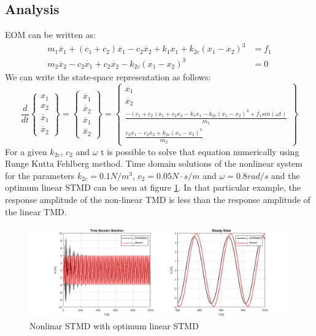 \subsection{Analysis}
EOM can be written as:\\
\begin{align*}
m_1 \ddot{x_1}+(c_1+c_2)\dot{x_1}-c_2\dot{x_2}+k_1x_1+k_{2c}(x_1-x_2)^3&=f_1\\
m_2 \ddot{x_2}-c_2\dot{x_1}+c_2\dot{x_2}-k_{2c}(x_1-x_2)^3&=0
\end{align*}
We can write the state-space representation as follows:
$$
\frac{d}{dt}\begin{Bmatrix}
 x_1\\
 x_2\\
 \dot{x_1}\\
 \dot{x_2}
\end{Bmatrix}=
\begin{Bmatrix}
 \dot{x_1}\\
 \dot{x_2}\\
 \ddot{x_1}\\
 \ddot{x_2}
\end{Bmatrix}=
\begin{Bmatrix}
 \dot{x_1}\\
 \dot{x_2}\\
 \frac{-(c_1+c_2)\dot{x_1}+c_2\dot{x_2}-k_1x_1-k_{2c}(x_1-x_2)^3+f_1sin(\omega t)}{m_1}\\
\frac{c_2\dot{x_1}-c_2\dot{x_2}+k_{2c}(x_1-x_2)^3}{m_2} 
\end{Bmatrix}
$$
For a given $ k_{2c} $, $ c_2 $ and $ \omega $ t is possible to solve that equation numerically using Runge Kutta Fehlberg method. Time domain solutions of the nonlinear system for the parameters $k_{2c} = 0.1 N/m^3$, $ c_2 = 0.05 N \cdot s / m $ and $ \omega = 0.8 rad/s $  and the optimum linear STMD can be seen at figure \ref{fig:nonlinearTimeDomain}. In that particular example, the response amplitude of the non-linear TMD is less than the response amplitude of the linear TMD.\\
\begin{figure}[ht]
    \centering
    \centerfloat
    \includegraphics[scale=0.6]{MATLAB Figures/nonlinear time domain.png}
    \caption{Nonlinar STMD with optimum linear STMD}
    \label{fig:nonlinearTimeDomain}
\end{figure}
